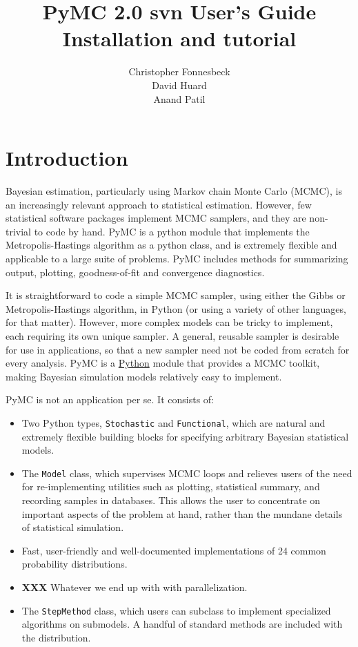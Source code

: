 \documentclass[]{book}
\title{PyMC 2.0 svn User's Guide \\
Installation and tutorial}
\author{ Christopher Fonnesbeck\\ David Huard \\ Anand Patil }
\begin{document}
\ifpdf
{}
\else
{}
\fi

\maketitle

\tableofcontents

\chapter{Introduction} %

Bayesian estimation, particularly using Markov chain Monte Carlo (MCMC), is an increasingly relevant approach to statistical estimation. However, few statistical software packages implement MCMC samplers, and they are non-trivial to code by hand. PyMC is a python module that implements the Metropolis-Hastings algorithm as a python class, and is extremely flexible and applicable to a large suite of problems. PyMC includes methods for summarizing output, plotting, goodness-of-fit and convergence diagnostics.

It is straightforward to code a simple MCMC sampler, using either the Gibbs or Metropolis-Hastings algorithm, in Python (or using a variety of other languages, for that matter). However, more complex models can be tricky to implement, each requiring its own unique sampler. A general, reusable sampler is desirable for use in applications, so that a new sampler need not be coded from scratch for every analysis. PyMC is a \href{http://python.org}{Python} module that provides a MCMC toolkit, making Bayesian simulation models relatively easy to implement.

\bigskip
PyMC is not an application per se. It consists of:
\begin{itemize}
    \item Two Python types, \texttt{Stochastic} and \texttt{Functional}, which are natural and extremely flexible building blocks for specifying arbitrary Bayesian statistical models.
    \item The \texttt{Model} class, which supervises MCMC loops and relieves users of the need for re-implementing utilities such as plotting, statistical summary, and recording samples in databases. This allows the user to concentrate on important aspects of the problem at hand, rather than the mundane details of statistical simulation.
    \item Fast, user-friendly and well-documented implementations of 24 common probability distributions.
    \item \textbf{XXX} Whatever we end up with with parallelization.
    \item The \texttt{StepMethod} class, which users can subclass to implement specialized algorithms on submodels. A handful of standard methods are included with the distribution.
\end{itemize}
\end{document}
